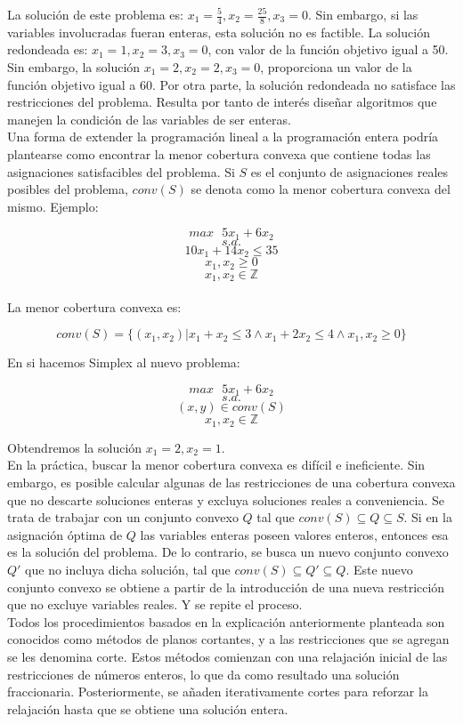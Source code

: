 \documentclass[runningheads]{llncs}
\begin{document}
La solución de este problema es: $x_1 = \frac54,x_2 = \frac{25}{8},x_3 = 0$. Sin embargo, si las variables involucradas fueran enteras, esta solución no es factible. La solución redondeada es: $x_1 = 1,x_2 = 3,x_3 = 0$, con valor de la función objetivo igual a 50. Sin embargo, la solución $x_1 = 2,x_2 = 2,x_3 = 0$, proporciona un valor de la función objetivo igual a 60. Por otra parte, la solución redondeada no satisface las restricciones del problema. Resulta por tanto de interés diseñar algoritmos que manejen la condición de las variables de ser enteras.\\

Una forma de extender la programación lineal a la programación entera podría plantearse como encontrar la menor cobertura convexa que contiene todas las asignaciones satisfacibles del problema. Si $S$ es el conjunto de asignaciones reales posibles del problema, $conv(S)$ se denota como la menor cobertura convexa del mismo. Ejemplo:

$$max \text{ } 5x_1+6x_2$$
$$s.a.$$
$$10x_1+14x_2 \leq  35$$
$$x_1,x_2\geq 0$$
$$x_1,x_2\in\mathbb{Z}$$\\

La menor cobertura convexa es:

$$conv(S)=\{(x_1,x_2)|x_1+x_2\leq 3 \land x_1+2x_2\leq 4 \land x_1,x_2\geq 0\}$$

En si hacemos Simplex al nuevo problema:

$$max \text{ } 5x_1+6x_2$$
$$s.a.$$
$$(x,y) \in conv(S)$$
$$x_1,x_2\in\mathbb{Z}$$

Obtendremos la solución $x_1=2, x_2=1$.\\

En la práctica, buscar la menor cobertura convexa es difícil e ineficiente. Sin embargo, es posible calcular algunas de las restricciones de una cobertura convexa que no descarte soluciones enteras y excluya soluciones reales a conveniencia. Se trata de trabajar con un conjunto convexo $Q$ tal que $conv(S)\subseteq Q\subseteq S$. Si en la asignación óptima de $Q$ las variables enteras poseen valores enteros, entonces esa es la solución del problema. De lo contrario, se busca un nuevo conjunto convexo $Q'$ que no incluya dicha solución, tal que $conv(S)\subseteq Q'\subseteq Q$. Este nuevo conjunto convexo se obtiene a partir de la introducción de una nueva restricción que no excluye variables reales. Y se repite el proceso.\\

Todos los procedimientos basados en la explicación anteriormente planteada son conocidos como métodos de planos cortantes, y a las restricciones que se agregan se les denomina corte. Estos métodos comienzan con una relajación inicial de las restricciones de números enteros, lo que da como resultado una solución fraccionaria. Posteriormente, se añaden iterativamente cortes para reforzar la relajación hasta que se obtiene una solución entera.\\
\end{document}
